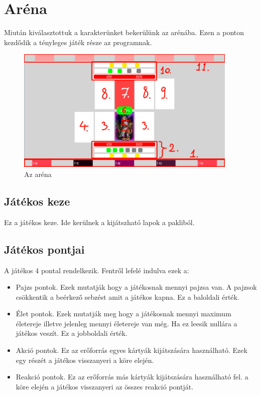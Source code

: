 \section{Aréna}
Miután kiválasztottuk a karakterünket bekerülünk az arénába. Ezen a ponton kezdődik a tényleges játék része az programnak.
\begin{figure}[h]
        \centering
        \includegraphics[width=400px,keepaspectratio]{images/BoardExpl.png}
        \caption {Az aréna}
        \label{Arena_full}
    \hspace{1em}
\end{figure}
\subsection{Játékos keze}
Ez a játékos keze. Ide kerülnek a kijátszható lapok a pakliból.
\subsection{Játékos pontjai}
A játékos 4 pontal rendelkezik. Fentről lefelé indulva ezek a:
\begin{itemize}
    \item Pajzs pontok. Ezek mutatják hogy a játékosnak mennyi pajzsa van. A pajzsok csökkentik a beérkező sebzést amit a játékos kapna. Ez a baloldali érték.
    \item Élet pontok. Ezek mutatják meg hogy a játékosnak mennyi maximum életereje illetve jelenleg mennyi életereje van még. Ha ez leesik nullára a játékos veszít. Ez a jobboldali érték.
    \item Akció pontok. Ez az erőforrás egyes kártyák kijátszására használható. Ezek egy részét a játékos visszanyeri a köre elején.
    \item Reakció pontok. Ez az erőforrás más kártyák kijátszására használható fel. a köre elején a játékos visszanyeri az összes reakció pontját.
\end{itemize}
